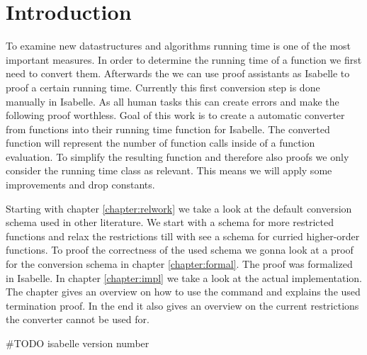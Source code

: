 \chapter{Introduction}\label{chapter:introduction}

To examine new datastructures and algorithms running time is one of the most important measures.
In order to determine the running time of a function we first need to convert them.
Afterwards the we can use proof assistants as Isabelle to proof a certain running time.
Currently this first conversion step is done manually in Isabelle.
As all human tasks this can create errors and make the following proof worthless.
Goal of this work is to create a automatic converter from functions into their running time function for Isabelle.
The converted function will represent the number of function calls inside of a function evaluation.
To simplify the resulting function and therefore also proofs we only consider the running time class as relevant.
This means we will apply some improvements and drop constants.

Starting with chapter \ref{chapter:relwork} we take a look at the default conversion schema used in other literature. We start with a schema for more restricted functions and relax the restrictions till with see a schema for curried higher-order functions.
To proof the correctness of the used schema we gonna look at a proof for the conversion schema in chapter \ref{chapter:formal}. The proof was formalized in Isabelle.
In chapter \ref{chapter:impl} we take a look at the actual implementation. The chapter gives an overview on how to use the command and explains the used termination proof. In the end it also gives an overview on the current restrictions the converter cannot be used for.


\#TODO isabelle version number
